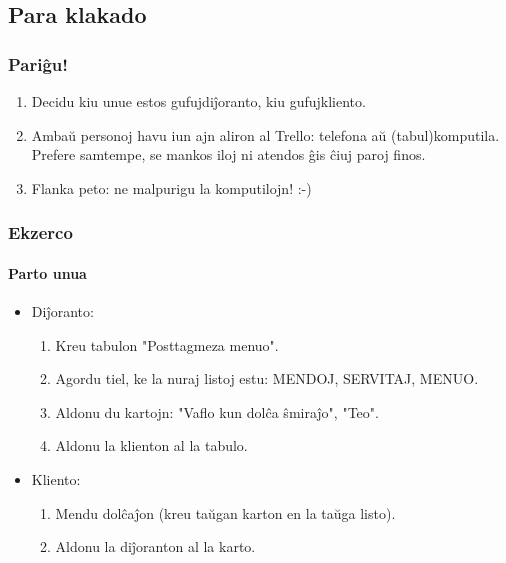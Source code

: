 



\subsection{Para klakado}
  \begin{frame}
    \frametitle{Pariĝu!}
    
    \begin{enumerate}

		\item Decidu kiu unue estos gufujdiĵoranto, kiu gufujkliento.
		\item Ambaŭ personoj havu iun ajn aliron al Trello: telefona aŭ (tabul)komputila. Prefere samtempe, se mankos iloj ni atendos ĝis ĉiuj paroj finos.
		\item Flanka peto: ne malpurigu la komputilojn! :-)
    
    \end{enumerate}
  \end{frame}


  \begin{frame}
    \frametitle{Ekzerco}
    \framesubtitle{Parto unua}

	\begin{itemize}
		\item Diĵoranto:
		\begin{enumerate}
			\item Kreu tabulon "Posttagmeza menuo".
			\item Agordu tiel, ke la nuraj listoj estu: MENDOJ, SERVITAJ, MENUO.
			\item Aldonu du kartojn: "Vaflo kun dolĉa ŝmiraĵo", "Teo".
			\item Aldonu la klienton al la tabulo.
		\end{enumerate}
			
		\item Kliento:
		\begin{enumerate}
			\item Mendu dolĉaĵon (kreu taŭgan karton en la taŭga listo).
			\item Aldonu la diĵoranton al la karto.
		\end{enumerate}    
	\end{itemize}
	    
  \end{frame}

